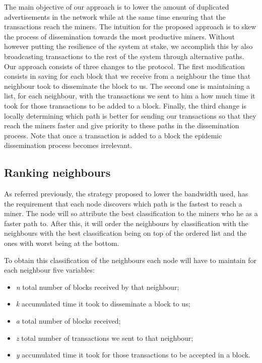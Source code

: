 \documentclass{dads}   %
\begin{document}
The main objective of our approach is to lower the amount of duplicated advertisements in the network while at the same time ensuring that the transactions reach the miners. The intuition for the proposed approach is to skew the process of dissemination towards the most productive miners. Without however putting the resilience of the system at stake, we accomplish this by also broadcasting transactions to the rest of the system through alternative paths. Our approach consists of three changes to the protocol. The first modification consists in saving for each block that we receive from a neighbour the time that neighbour took to disseminate the block to us. The second one is maintaining a list, for each neighbour, with the transactions we sent to him a how much time it took for those transactions to be added to a block. Finally, the third change is locally determining which path is better for sending our transactions so that they reach the miners faster and give priority to these paths in the dissemination process. Note that once a transaction is added to a block the epidemic dissemination process becomes irrelevant.

\subsection{Ranking neighbours}
As referred previously, the strategy proposed to lower the bandwidth used, has the requirement that each node discovers which path is the fastest to reach a miner. The node will so attribute the best classification to the miners who he as a faster path to. After this, it will order the neighbours by classification with the neighbours with the best classification being on top of the ordered list and the ones with worst being at the bottom.

To obtain this classification of the neighbours each node will have to maintain for each neighbour five variables:
\begin{itemize}
  \item \textit{n} total number of blocks received by that neighbour;
  \item \textit{k} accumulated time it took to disseminate a block to us;
  \item \textit{a} total number of blocks received;
  \item \textit{z} total number of transactions we sent to that neighbour;
  \item \textit{y} accumulated time it took for those transactions to be accepted in a block.
\end{itemize}
\end{document}
